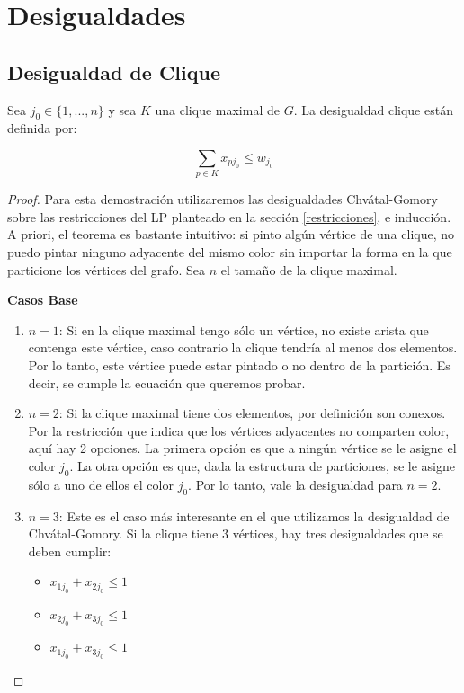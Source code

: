 \section{Desigualdades}

\subsection{Desigualdad de Clique}

Sea $j_0 \in \{1,...,n\}$ y sea $K$ una clique maximal de $G$. La desigualdad clique están definida por:

\begin{equation}
\sum_{p \in K} x_{pj_0} \leq w_{j_0}
\end{equation}

\begin{proof}
Para esta demostración utilizaremos las desigualdades Chvátal-Gomory sobre las restricciones del LP planteado en la sección \ref{restricciones}, e inducción. A priori, el teorema es bastante intuitivo: si pinto algún vértice de una clique, no puedo pintar ninguno adyacente del mismo color sin importar la forma en la que particione los vértices del grafo. Sea $n$ el tamaño de la clique maximal.

\hfill

\textbf{Casos Base}
\begin{enumerate}
\item $n=1$: Si en la clique maximal tengo sólo un vértice, no existe arista que contenga este vértice, caso contrario la clique tendría al menos dos elementos. Por lo tanto, este vértice puede estar pintado o no dentro de la partición. Es decir, se cumple la ecuación que queremos probar.
\item $n=2$: Si la clique maximal tiene dos elementos, por definición son conexos. Por la restricción que indica que los vértices adyacentes no comparten color, aquí hay 2 opciones. La primera opción es que a ningún vértice se le asigne el color $j_0$. La otra opción es que, dada la estructura de particiones, se le asigne sólo a uno de ellos el color $j_0$. Por lo tanto, vale la desigualdad para $n=2$.
\item $n=3$: Este es el caso más interesante en el que utilizamos la desigualdad de Chvátal-Gomory. Si la clique tiene 3 vértices, hay tres desigualdades que se deben cumplir:

\begin{itemize}
\item $x_{1j_0} + x_{2j_0} \leq 1$
\item $x_{2j_0} + x_{3j_0} \leq 1$
\item $x_{1j_0} + x_{3j_0} \leq 1$
\end{itemize}


\end{enumerate}
\end{proof}
